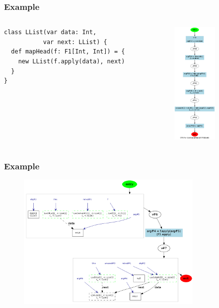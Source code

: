 \documentclass[hyperref={pdfpagelabels=false}]{beamer}
\begin{document}
\begin{frame}[fragile]
\frametitle{Example}
  \begin{columns}
    \begin{column}{0.4\textwidth}
\begin{lstlisting}[escapechar=\%]
class LList(var data: Int,
           var next: LList) {
  def mapHead(f: F1[Int, Int]) = {
    new LList(f.apply(data), next)
  }
}
\end{lstlisting}
    \end{column}
    \begin{column}{0.6\textwidth}
      \begin{figure}[t]
        \includegraphics[height=60mm]{images/e3.png}\\
      \end{figure}
    \end{column}
  \end{columns}
\end{frame}

\begin{frame}[fragile]
\frametitle{Example}
  \begin{figure}[t]
    \begin{center}
    \includegraphics[width=90mm]{images/e4.png}\\
    \end{center}
  \end{figure}
\end{frame}
\end{document}
